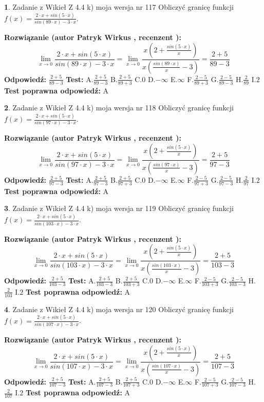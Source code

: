 \documentclass[12pt, a4paper]{article}
\theoremstyle{definition} %
\newtheorem{zad}{}
\newcommand{\zadStart}[1]{\begin{zad}#1\newline}
\newcommand{\zadStop}{\end{zad}}
\newcommand{\rozwStart}[2]{\noindent \textbf{Rozwiązanie (autor #1 , recenzent #2): }\newline}
\newcommand{\rozwStop}{\newline}
\newcommand{\odpStart}{\noindent \textbf{Odpowiedź:}\newline}
\newcommand{\odpStop}{\newline}
\newcommand{\testStart}{\noindent \textbf{Test:}\newline}
\newcommand{\testStop}{\newline}
\newcommand{\kluczStart}{\noindent \textbf{Test poprawna odpowiedź:}\newline}
\newcommand{\kluczStop}{\newline}
\begin{document}
\zadStart{Zadanie z Wikieł Z 4.4 k) moja wersja nr 117}
Obliczyć granicę funkcji $f(x)=\frac{2\cdot x +sin(5\cdot x)}{sin(89\cdot x) -3\cdot x}$.
\zadStop
\rozwStart{Patryk Wirkus}{}
$$\lim\limits_{x\to 0}\frac{2\cdot x +sin(5\cdot x)}{sin(89\cdot x) -3\cdot x}
=\lim\limits_{x\to 0}\frac{x(2+\frac{sin(5\cdot x)}{x})}{x(\frac{sin(89\cdot x)}{x}-3)}
=\frac{2+5}{89-3}$$
\rozwStop
\odpStart
$\frac{2+5}{89-3}$
\odpStop
\testStart
A.$\frac{2+5}{89-3}$
B.$\frac{2+5}{89+3}$
C.$0$
D.$-\infty$
E.$\infty$
F.$\frac{2-5}{89+3}$
G.$\frac{2-5}{89-3}$
H.$\frac{2}{89}$
I.$2$
\testStop
\kluczStart
A
\kluczStop



\zadStart{Zadanie z Wikieł Z 4.4 k) moja wersja nr 118}
Obliczyć granicę funkcji $f(x)=\frac{2\cdot x +sin(5\cdot x)}{sin(97\cdot x) -3\cdot x}$.
\zadStop
\rozwStart{Patryk Wirkus}{}
$$\lim\limits_{x\to 0}\frac{2\cdot x +sin(5\cdot x)}{sin(97\cdot x) -3\cdot x}
=\lim\limits_{x\to 0}\frac{x(2+\frac{sin(5\cdot x)}{x})}{x(\frac{sin(97\cdot x)}{x}-3)}
=\frac{2+5}{97-3}$$
\rozwStop
\odpStart
$\frac{2+5}{97-3}$
\odpStop
\testStart
A.$\frac{2+5}{97-3}$
B.$\frac{2+5}{97+3}$
C.$0$
D.$-\infty$
E.$\infty$
F.$\frac{2-5}{97+3}$
G.$\frac{2-5}{97-3}$
H.$\frac{2}{97}$
I.$2$
\testStop
\kluczStart
A
\kluczStop



\zadStart{Zadanie z Wikieł Z 4.4 k) moja wersja nr 119}
Obliczyć granicę funkcji $f(x)=\frac{2\cdot x +sin(5\cdot x)}{sin(103\cdot x) -3\cdot x}$.
\zadStop
\rozwStart{Patryk Wirkus}{}
$$\lim\limits_{x\to 0}\frac{2\cdot x +sin(5\cdot x)}{sin(103\cdot x) -3\cdot x}
=\lim\limits_{x\to 0}\frac{x(2+\frac{sin(5\cdot x)}{x})}{x(\frac{sin(103\cdot x)}{x}-3)}
=\frac{2+5}{103-3}$$
\rozwStop
\odpStart
$\frac{2+5}{103-3}$
\odpStop
\testStart
A.$\frac{2+5}{103-3}$
B.$\frac{2+5}{103+3}$
C.$0$
D.$-\infty$
E.$\infty$
F.$\frac{2-5}{103+3}$
G.$\frac{2-5}{103-3}$
H.$\frac{2}{103}$
I.$2$
\testStop
\kluczStart
A
\kluczStop



\zadStart{Zadanie z Wikieł Z 4.4 k) moja wersja nr 120}
Obliczyć granicę funkcji $f(x)=\frac{2\cdot x +sin(5\cdot x)}{sin(107\cdot x) -3\cdot x}$.
\zadStop
\rozwStart{Patryk Wirkus}{}
$$\lim\limits_{x\to 0}\frac{2\cdot x +sin(5\cdot x)}{sin(107\cdot x) -3\cdot x}
=\lim\limits_{x\to 0}\frac{x(2+\frac{sin(5\cdot x)}{x})}{x(\frac{sin(107\cdot x)}{x}-3)}
=\frac{2+5}{107-3}$$
\rozwStop
\odpStart
$\frac{2+5}{107-3}$
\odpStop
\testStart
A.$\frac{2+5}{107-3}$
B.$\frac{2+5}{107+3}$
C.$0$
D.$-\infty$
E.$\infty$
F.$\frac{2-5}{107+3}$
G.$\frac{2-5}{107-3}$
H.$\frac{2}{107}$
I.$2$
\testStop
\kluczStart
A
\kluczStop
\end{document}
